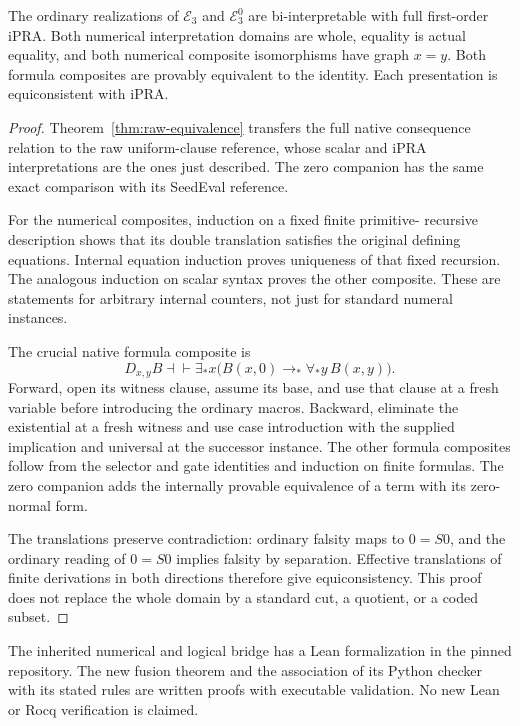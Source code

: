 \begin{theorem}
\label{thm:biinterp}
The ordinary realizations of $\mathcal E_3$ and $\mathcal E^0_3$ are
bi-interpretable with full first-order iPRA. Both numerical interpretation
domains are whole, equality is actual equality, and both numerical
composite isomorphisms have graph $x=y$. Both formula composites are
provably equivalent to the identity. Each presentation is equiconsistent
with iPRA.
\end{theorem}
\begin{proof}
Theorem~\ref{thm:raw-equivalence} transfers the full native consequence
relation to the raw uniform-clause reference, whose scalar and iPRA
interpretations are the ones just described. The zero companion has the
same exact comparison with its SeedEval reference.

For the numerical composites, induction on a fixed finite primitive-
recursive description shows that its double translation satisfies the
original defining equations. Internal equation induction proves uniqueness
of that fixed recursion. The analogous induction on scalar syntax proves
the other composite. These are statements for arbitrary internal counters,
not just for standard numeral instances.

The crucial native formula composite is
\[
 D_{x,y}B\dashv\vdash
 \exists_*x\bigl(B(x,0)\to_*\forall_*y\,B(x,y)\bigr).
\]
Forward, open its witness clause, assume its base, and use that clause
at a fresh variable before introducing the ordinary macros. Backward,
eliminate the existential at a fresh witness and use case introduction
with the supplied implication and universal at the successor instance.
The other formula composites follow from the selector and gate identities
and induction on finite formulas. The zero companion adds the internally
provable equivalence of a term with its zero-normal form.

The translations preserve contradiction: ordinary falsity maps to
$0=S0$, and the ordinary reading of $0=S0$ implies falsity by separation.
Effective translations of finite derivations in both directions therefore
give equiconsistency. This proof does not replace the whole domain by a
standard cut, a quotient, or a coded subset.
\end{proof}

The inherited numerical and logical bridge has a Lean formalization in
the pinned repository. The new fusion theorem and the association of its
Python checker with its stated rules are written proofs with executable
validation. No new Lean or Rocq verification is claimed.
